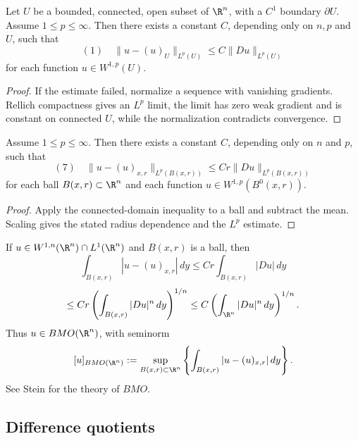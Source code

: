 \begin{theorem}
\label{thm:poincares-inequality-connected}
Let $U$ be a bounded, connected, open subset of $\R^n$, with a $C^1$ boundary $\partial U$. Assume $1 \le p \le \infty$. Then there exists a constant $C$, depending only on $n,p$ and $U$, such that
$$(1) \quad \|u - (u)_U\|_{L^p(U)} \le C\|Du\|_{L^p(U)}$$
for each function $u \in W^{1,p}(U)$.
\end{theorem}

\begin{proof}
\sketch If the estimate failed, normalize a sequence with vanishing gradients. Rellich compactness gives an $L^p$ limit, the limit has zero weak gradient and is constant on connected $U$, while the normalization contradicts convergence.
\end{proof}

\begin{theorem}
\label{thm:poincares-inequality-ball}
Assume $1 \le p \le \infty$. Then there exists a constant $C$, depending only on $n$ and $p$, such that
$$(7) \quad \|u - (u)_{x,r}\|_{L^p(B(x,r))} \le Cr\|Du\|_{L^p(B(x,r))}$$
for each ball $B(x,r) \subset \R^n$ and each function $u \in W^{1,p}(B^0(x,r))$.
\end{theorem}

\begin{proof}
\sketch Apply the connected-domain inequality to a ball and subtract the mean. Scaling gives the stated radius dependence and the $L^p$ estimate.
\end{proof}

\begin{remark}
\label{rem:bmo-remark}
If $u \in W^{1,n}(\R^n) \cap L^1(\R^n)$ and $B(x,r)$ is a ball, then
$$\int_{B(x,r)} |u - (u)_{x,r}|\, dy \le Cr\int_{B(x,r)} |Du|\, dy$$
$$\le Cr \left(\int_{B(x,r)} |Du|^n\, dy\right)^{1/n} \le C\left(\int_{\R^n} |Du|^n\, dy\right)^{1/n}.$$
Thus $u \in BMO(\R^n)$, with seminorm
$$[u]_{BMO(\R^n)} := \sup_{B(x,r) \subset \R^n} \left\{\int_{B(x,r)} |u - (u)_{x,r}|\, dy\right\}.$$
See Stein \cite{Stein1993} for the theory of $BMO$.
\end{remark}

\subsection{Difference quotients}

